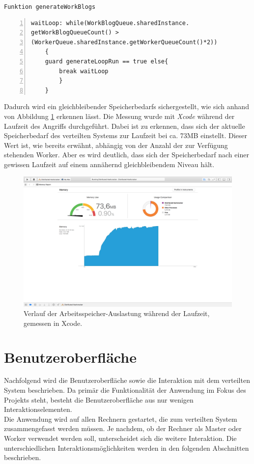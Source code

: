 \texttt{Funktion generateWorkBlogs}
\begin{lstlisting}[basicstyle=\ttfamily,numbers=left,numberstyle=\footnotesize\ttfamily,backgroundcolor=\color{sourcegray}]
waitLoop: while(WorkBlogQueue.sharedInstance.
getWorkBlogQueueCount() > 
(WorkerQueue.sharedInstance.getWorkerQueueCount()*2))
	{
	guard generateLoopRun == true else{ 
		break waitLoop
		}
	}
\end{lstlisting}

Dadurch wird ein gleichbleibender Speicherbedarfs sichergestellt, wie sich anhand von Abbildung \ref{fig:screenshot_ram} erkennen lässt. Die Messung wurde mit \emph{Xcode} während der Laufzeit des Angriffs durchgeführt. Dabei ist zu erkennen, dass sich der aktuelle Speicherbedarf des verteilten Systems zur Laufzeit bei ca. 73MB einstellt. Dieser Wert ist, wie bereits erwähnt, abhängig von der Anzahl der zur Verfügung stehenden Worker. Aber es wird deutlich, dass sich der Speicherbedarf nach einer gewissen Laufzeit auf einem annähernd gleichbleibendem Niveau hält. 

\begin{figure}[!ht]
	\centering

		\includegraphics[natwidth=1200pt, natheight=349pt, width=1.0\textwidth]{images/screenshot_ram.png}
	\caption{Verlauf der Arbeitsspeicher-Auslastung während der Laufzeit, gemessen in Xcode.}
	\label{fig:screenshot_ram}
\end{figure}


\section{Benutzeroberfläche}
Nachfolgend wird die Benutzeroberfläche sowie die Interaktion mit dem verteilten System beschrieben. Da primär die Funktionalität der Anwendung im Fokus des Projekts steht, besteht die Benutzeroberfläche aus nur wenigen Interaktionselementen. \\
Die Anwendung wird auf allen Rechnern gestartet, die zum verteilten System zusammengefasst werden müssen. Je nachdem, ob der Rechner als Master oder Worker verwendet werden soll, unterscheidet sich die weitere Interaktion. Die unterschiedlichen Interaktionsmöglichkeiten werden in den folgenden Abschnitten beschrieben. 

